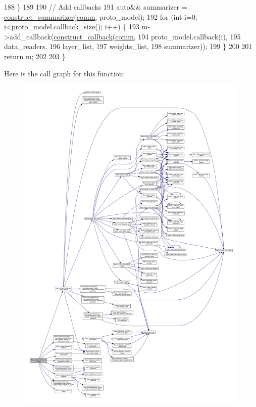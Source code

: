 \begin{DoxyCode}
188   \}
189 
190   \textcolor{comment}{// Add callbacks}
191   \textcolor{keyword}{auto}&& summarizer = \hyperlink{namespacelbann_1_1proto_abf0988db9cd58f9ef013588b440c14bd}{construct\_summarizer}(\hyperlink{file__io_8cpp_ab048c6f9fcbcfaa57ce68b00263dbebe}{comm}, proto\_model);
192   \textcolor{keywordflow}{for} (\textcolor{keywordtype}{int} i=0; i<proto\_model.callback\_size(); i++) \{
193     m->add\_callback(\hyperlink{namespacelbann_1_1proto_a00597c8b7450c389847980cf6934a619}{construct\_callback}(\hyperlink{file__io_8cpp_ab048c6f9fcbcfaa57ce68b00263dbebe}{comm},
194                                        proto\_model.callback(i),
195                                        data\_readers,
196                                        layer\_list,
197                                        weights\_list,
198                                        summarizer));
199   \}
200 
201   \textcolor{keywordflow}{return} m;
202 
203 \}
\end{DoxyCode}
Here is the call graph for this function\+:\nopagebreak
\begin{figure}[H]
\begin{center}
\leavevmode
\includegraphics[width=350pt]{namespacelbann_1_1proto_a6c051439c9c5cbbfb1a2387d5a3fc902_cgraph}
\end{center}
\end{figure}
